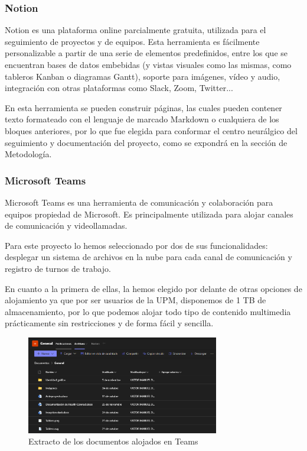         \subsubsection{Notion}
            Notion es una plataforma online parcialmente gratuita, utilizada para el seguimiento de proyectos y de 
            equipos. Esta herramienta es fácilmente personalizable a partir de una serie de elementos predefinidos, 
            entre los que se encuentran bases de datos embebidas (y vistas visuales como las mismas, como tableros 
            Kanban o diagramas Gantt), soporte para imágenes, vídeo y audio, integración con otras plataformas como 
            Slack, Zoom, Twitter... 
                
            En esta herramienta se pueden construir páginas, las cuales pueden contener texto formateado con el 
            lenguaje de marcado Markdown o cualquiera de los bloques anteriores, por lo que fue elegida para conformar 
            el centro neurálgico del seguimiento y documentación del proyecto, como se expondrá en la sección de 
            Metodología. 
            
        \subsubsection{Microsoft Teams}
            Microsoft Teams es una herramienta de comunicación y colaboración para equipos propiedad de Microsoft. 
            Es principalmente utilizada para alojar canales de comunicación y videollamadas. 
                
            Para este proyecto lo hemos seleccionado por dos de sus funcionalidades: desplegar un sistema de archivos 
            en la nube para cada canal de comunicación y registro de turnos de trabajo. 
            
            En cuanto a la primera de ellas, la hemos elegido por delante de otras opciones de alojamiento ya 
            que por ser usuarios de la UPM, disponemos de 1 TB de almacenamiento, por lo que podemos alojar todo 
            tipo de contenido multimedia prácticamente sin restricciones y de forma fácil y sencilla. 
            
            \begin{figure}[h!]
                \centering
                \includegraphics[width=0.75\textwidth]{figures/archivos teams.PNG}
                \caption{Extracto de los documentos alojados en Teams}
                \label{fig:teams:documentos}
            \end{figure}
            
